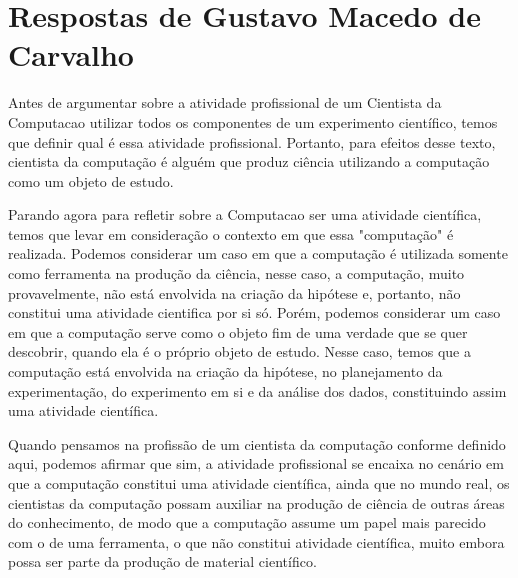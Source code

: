 \section{Respostas de Gustavo Macedo de Carvalho}

Antes de argumentar sobre a atividade profissional de um \gls{Cientista} da \gls{Computacao} utilizar todos os componentes de um experimento científico, temos que definir qual é essa atividade profissional. Portanto, para efeitos desse texto, cientista da computação é alguém que produz ciência utilizando a computação como um objeto de estudo.

Parando agora para refletir sobre a \gls{Computacao} ser uma atividade científica, temos que levar em consideração o contexto em que essa "computação" é realizada. Podemos considerar um caso em que a computação é utilizada somente como ferramenta na produção da ciência, nesse caso, a computação, muito provavelmente, não está envolvida na criação da hipótese e, portanto, não constitui uma atividade cientifica por si só. Porém, podemos considerar um caso em que a computação serve como o objeto fim de uma verdade que se quer descobrir, quando ela é o próprio objeto de estudo. Nesse caso, temos que a computação está envolvida na criação da hipótese, no planejamento da experimentação, do experimento em si e da análise dos dados, constituindo assim uma atividade científica.

Quando pensamos na profissão de um cientista da computação conforme definido aqui, podemos afirmar que sim, a atividade profissional se encaixa no cenário em que a computação constitui uma atividade científica, ainda que no mundo real, os cientistas da computação possam auxiliar na produção de ciência de outras áreas do conhecimento, de modo que a computação assume um papel mais parecido com o de uma ferramenta, o que não constitui atividade científica, muito embora possa ser parte da produção de material científico.
